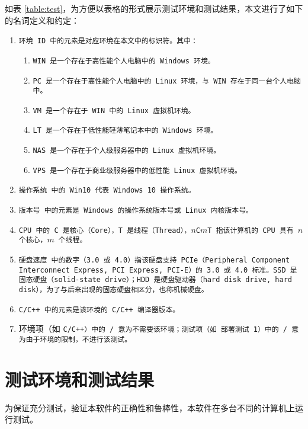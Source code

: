 如表 \ref{table:test}，为方便以表格的形式展示测试环境和测试结果，本文进行了如下的名词定义和约定：

\begin{enumerate}
    \item \tt{环境 ID} 中的元素是对应环境在本文中的标识符。其中：
    \begin{enumerate}
        \item \tt{WIN} 是一个存在于高性能个人电脑中的 Windows 环境。
        \item \tt{PC} 是一个存在于高性能个人电脑中的 Linux 环境，与 \tt{WIN} 存在于同一台个人电脑中。
        \item \tt{VM} 是一个存在于 \tt{WIN} 中的 Linux 虚拟机环境。
        \item \tt{LT} 是一个存在于低性能轻薄笔记本中的 Windows 环境。
        \item \tt{NAS} 是一个存在于个人级服务器中的 Linux 虚拟机环境。
        \item \tt{VPS} 是一个存在于商业级服务器中的低性能 Linux 虚拟机环境。
    \end{enumerate}
    \item \tt{操作系统} 中的 \tt{Win10} 代表 Windows 10 操作系统。
    \item \tt{版本号} 中的元素是 Windows 的操作系统版本号或 Linux 内核版本号。
    \item \tt{CPU} 中的 \tt{C} 是核心（Core），\tt{T} 是线程（Thread），\tt{$n$C$m$T} 指该计算机的 CPU 具有 $n$ 个核心，$m$ 个线程。
    \item \tt{硬盘速度} 中的数字（\tt{3.0} 或 \tt{4.0}）指该硬盘支持 PCIe（Peripheral Component Interconnect Express, PCI Express, PCI-E）的 3.0 或 4.0 标准。SSD 是固态硬盘（solid-state drive）；HDD 是硬盘驱动器（hard disk drive, hard disk），为了与后来出现的固态硬盘相区分，也称机械硬盘。
    \item \tt{C/C++} 中的元素是该环境的 C/C++ 编译器版本。
    \item 环境项（如 \tt{C/C++}）中的 \tt{/} 意为不需要该环境；测试项（如 \tt{部署测试 1}）中的 \tt{/} 意为由于环境的限制，不进行该测试。
\end{enumerate}

\section{测试环境和测试结果}

为保证充分测试，验证本软件的正确性和鲁棒性，本软件在多台不同的计算机上运行测试。

